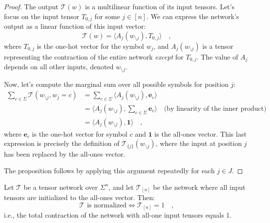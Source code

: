 \documentclass[../../main.tex]{subfiles}
\begin{document}
    \begin{proof}
The output $\mathcal{T}(w)$ is a multilinear function of its input tensors. Let's focus on the input tensor $T_{0,j}$ for some $j \in [n]$. We can express the network's output as a linear function of this input vector:
\[
    \mathcal{T}(w) = \langle A_j(w_{\setminus j}), T_{0,j} \rangle \quad ,
\]
where $T_{0,j}$ is the one-hot vector for the symbol $w_j$, and $A_j(w_{\setminus j})$ is a tensor representing the contraction of the entire network \emph{except} for $T_{0,j}$. The value of $A_j$ depends on all other inputs, denoted $w_{\setminus j}$.

Now, let's compute the marginal sum over all possible symbols for position $j$:
\begin{align*}
    \sum_{c \in \Sigma} \mathcal{T}(w_{\setminus j}, w_j=c) &= \sum_{c \in \Sigma} \langle A_j(w_{\setminus j}), \mathbf{e}_c \rangle \\
    &= \langle A_j(w_{\setminus j}), \sum_{c \in \Sigma} \mathbf{e}_c \rangle \quad \text{(by linearity of the inner product)} \\
    &= \langle A_j(w_{\setminus j}), \mathbf{1} \rangle \quad ,
\end{align*}
where $\mathbf{e}_c$ is the one-hot vector for symbol $c$ and $\mathbf{1}$ is the all-ones vector. This last expression is precisely the definition of $\mathcal{T}_{\{j\}}(w_{\setminus j})$, where the input at position $j$ has been replaced by the all-ones vector.

The proposition follows by applying this argument repeatedly for each $j \in J$.
\end{proof}

    \begin{corollary}
        Let $\mathcal{T}$ be a tensor network over $\Sigma^n$, and let $\mathcal{T}_{[n]}$ be the network where all input tensors are initialized to the all-ones vector. Then:
        \[
            \mathcal{T} \text{ is normalized} \iff \mathcal{T}_{[n]} = 1 \quad ,
        \]
        i.e., the total contraction of the network with all-one input tensors equals 1.
    \end{corollary}
\end{document}
